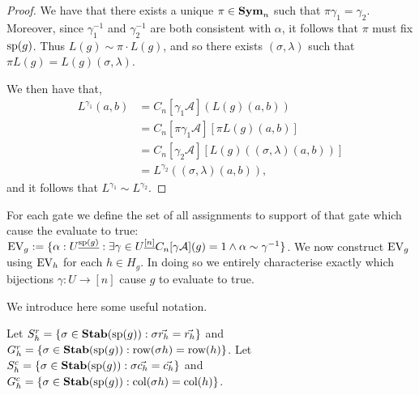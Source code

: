 \documentclass[../paper.tex]{subfiles}
\begin{document}
\begin{proof}
  We have that there exists a unique $\pi \in \text{\textbf{Sym}}_n$ such that $\pi \gamma_1 =
  \gamma_2$. Moreover, since $\gamma^{-1}_1$ and $\gamma^{-1}_2$ are both
  consistent with $\alpha$, it follows that $\pi$ must fix $\text{sp}(g)$. Thus
  $L(g) \sim \pi \cdot L(g)$, and so there exists $(\sigma, \lambda)$ such that
  $\pi L(g) = L(g) (\sigma, \lambda)$.

  We then have that,
  \begin{align*}
    L^{\gamma_1} (a,b) &= C_n[\gamma_1 \mathcal{A}](L(g)(a,b))\\
                       & = C_n[\pi \gamma_1 \mathcal{A}][\pi L(g)(a,b)] \\
                       & = C_n[\gamma_2 \mathcal{A}][L(g)((\sigma, \lambda)(a,b))]\\
                       & = L^{\gamma_2} ((\sigma, \lambda) (a,b)),
  \end{align*}
  and it follows that $L^{\gamma_1} \sim L^{\gamma_2}$.
\end{proof}

For each gate we define the set of all assignments to support of that gate which
cause the evaluate to true: $\text{EV}_g := \{ \alpha: U^{\underline{\text{sp}(g)}} :
\exists \gamma \in U^{\underline{[n]}} C_n [\gamma \mathcal{A}](g) = 1 \wedge
\alpha \sim \gamma^{-1}\}$. We now construct $\text{EV}_g$ using $\text{EV}_h$ for each $h
\in H_g$. In doing so we entirely characterise exactly which bijections $\gamma:
U \rightarrow [n]$ cause $g$ to evaluate to true.


We introduce here some useful notation.

\begin{definition}
  Let $S^r_h = \{ \sigma \in \text{\textbf{Stab}} (\text{sp}(g)) : \sigma \vec{r_h} = \vec{r_h}
  \}$ and $G^r_h = \{ \sigma \in \text{\textbf{Stab}}(\text{sp}(g)) : \text{row}(\sigma h) = \text{row}(h)\}$.
  Let $S^c_h = \{ \sigma \in \text{\textbf{Stab}} (\text{sp}(g)) : \sigma \vec{c_h} = \vec{c_h}
  \}$ and $G^c_h = \{ \sigma \in \text{\textbf{Stab}}(\text{sp}(g)) : \text{col}(\sigma h) =
  \text{col}(h)\}$.
\end{definition}
\end{document}
